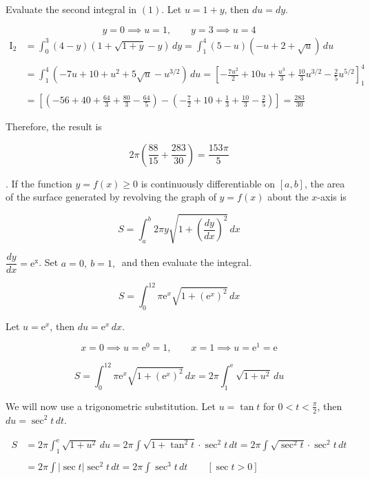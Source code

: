 \documentclass{article}
\begin{document}
\hfill

\noindent Evaluate the second integral in $(1)$. Let $u=1+y$, then $du=dy$.

\[y=0\implies u=1,\qquad y=3\implies u=4\]
\begin{align*}\mathrm{I}_2&=\int_0^3(4-y)\left(1+\sqrt{1+y}-y\right)\,dy=\int_1^4(5-u)\left(-u+2+\sqrt u\right)\,du\\\\&=\int_1^4\left(-7u+10+u^2+5\sqrt u-u^{3/2}\right)\,du=\left[-\frac{7u^2}2+10u+\frac{u^3}3+\frac{10}3u^{3/2}-\frac25u^{5/2}\right]_1^4\\\\&=\left[\left(-56+40+\frac{64}3+\frac{80}3-\frac{64}5\right)-\left(-\frac72+10+\frac13+\frac{10}3-\frac25\right)\right]=\frac{283}{30}\end{align*}

\hfill

\noindent Therefore, the result is

\[2\pi\left(\frac{88}{15}+\frac{283}{30}\right)=\boxed{\frac{153\pi}5}\]

\hfill

. If the function $y=f(x)\geq0$ is continuously differentiable on $[a,b]$, the area of the surface generated by revolving the graph of $y=f(x)$ about the $x$-axis is

\[S=\int_a^b2\pi y\sqrt{1+\left(\frac{dy}{dx}\right)^2}\,dx\]

\hfill

\noindent $\dfrac{dy}{dx}=\mathrm{e^x}$. Set $a=0,\:b=1,\:$ and then evaluate the integral.

\[S=\int_0^12\pi\mathrm{e}^x\sqrt{1+\left(\mathrm{e}^x\right)^2}\,dx\]

\hfill

\noindent Let $u=\mathrm{e}^x$, then $du=\mathrm{e}^x\,dx$.

\[x=0\implies u=\mathrm{e}^0=1,\qquad x=1\implies u=\mathrm{e}^1=\mathrm{e}\]

\[S=\int_0^12\pi\mathrm{e}^x\sqrt{1+\left(\mathrm{e}^x\right)^2}\,dx=2\pi\int_1^{\mathrm{e}}\sqrt{1+u^2}\,du\]

\hfill

\noindent We will now use a trigonometric substitution. Let $u=\tan t$ for $\displaystyle0<t<\frac\pi2$, then $du=\sec^2 t\,dt$.

\begin{align*}S&=2\pi\int_1^{\mathrm{e}}\sqrt{1+u^2}\,du=2\pi\int\sqrt{1+\tan^2t}\cdot\sec^2t\,dt=2\pi\int\sqrt{\sec^2t}\cdot\sec^2t\,dt\\\\&=2\pi\int\left|\sec t\right|\sec^2t\,dt=2\pi\int\sec^3t\,dt\qquad\left[\sec t>0\right]\end{align*}
\end{document}
